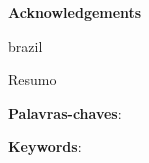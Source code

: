 \renewcommand{\sfdefault}{\rmdefault}
\imprimircapa


\setcounter{page}{2}
\renewcommand{\sfdefault}{\rmdefault}
\imprimirfolhaderosto*


\renewcommand{\sfdefault}{\rmdefault}
\begin{fichacatalografica}
\end{fichacatalografica}

% 
\cleardoublepage


\renewcommand{\sfdefault}{\rmdefault}
\begin{dedicatoria}
    \vspace*{\fill}
    \centering
    \noindent
    \textit{}
    \vspace*{\fill}
\end{dedicatoria}

\renewcommand{\sfdefault}{\rmdefault}
\begin{agradecimentos}[Agradecimentos]
    
    \vspace{5mm}
    {\centering \Large \textbf{Acknowledgements}}

    
\end{agradecimentos}

\begin{otherlanguage*}{brazil}
\renewcommand{\sfdefault}{\rmdefault}
    \begin{center}{\ABNTEXchapterfont\huge Resumo}\end{center}
    
    \vspace{\onelineskip}
    \noindent\textbf{Palavras-chaves}: 
    \vspace{\fill}
\end{otherlanguage*}
\cleardoublepage

\begin{resumo}
\renewcommand{\sfdefault}{\rmdefault}
    

    \noindent\textbf{Keywords}: 
    \vspace{\fill}
\end{resumo}

\renewcommand{\sfdefault}{\rmdefault}
\listoffigures*
\cleardoublepage


\renewcommand{\sfdefault}{\rmdefault}
\listoftables*
\cleardoublepage

\renewcommand{\sfdefault}{\rmdefault}
\printglossaries
\cleardoublepage


\renewcommand{\sfdefault}{\rmdefault}
\tableofcontents*
\cleardoublepage
